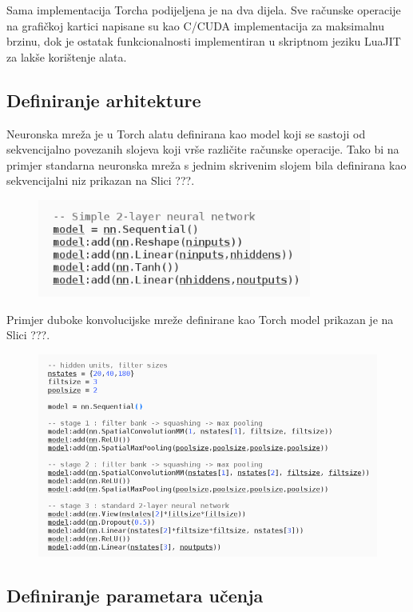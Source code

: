 \documentclass[lmodern, utf8, diplomski, numeric]{fer}
\begin{document}
Sama implementacija Torcha podijeljena je na dva dijela. Sve računske operacije na grafičkoj kartici napisane su kao C/CUDA implementacija za maksimalnu brzinu, dok je ostatak funkcionalnosti implementiran u skriptnom jeziku LuaJIT za lakše korištenje alata.  

\subsection{Definiranje arhitekture}
	
Neuronska mreža je u Torch alatu definirana kao model koji se sastoji od sekvencijalno povezanih slojeva koji vrše različite računske operacije.
Tako bi na primjer standarna neuronska mreža s jednim skrivenim slojem bila definirana kao sekvencijalni niz prikazan na Slici ???. 

\begin{figure}[ht!]
\centering
\includegraphics[width=9cm]{slike/nn_model.png}
\caption{}
\end{figure}

Primjer duboke konvolucijske mreže definirane kao Torch model prikazan je na Slici ???.

\begin{figure}[ht!]
\centering
\includegraphics[width=16cm]{slike/cnn_model.png}
\caption{}
\end{figure}

\subsection{Definiranje parametara učenja}
\end{document}

